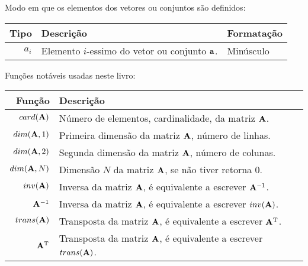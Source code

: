 \begin{notation}Modo em que os elementos dos vetores ou conjuntos são definidos:\\
\begin{tabular}{r | p{.6\linewidth} | l}
\hline	
Tipo & Descrição & Formatação \\ \hline
$a_{i}$ & Elemento $i$-essimo do vetor ou conjunto  $\VECTOR{a}$.& Minúsculo \\
\end{tabular}
\end{notation}


\begin{notation}Funções notáveis usadas neste livro:\\
\begin{tabular}{r | l }
\hline	
Função & Descrição \\ \hline
$card(\MATRIX{A})$ & Número de elementos, cardinalidade, da matriz $\MATRIX{A}$. \\
\hline
$dim(\MATRIX{A},1)$ & Primeira dimensão da matriz $\MATRIX{A}$, número de linhas. \\
$dim(\MATRIX{A},2)$ & Segunda dimensão da matriz $\MATRIX{A}$, número de colunas. \\
$dim(\MATRIX{A},N)$ & Dimensão $N$ da matriz $\MATRIX{A}$, se não tiver retorna $0$. \\
\hline
$\funcinv(\MATRIX{A})$ & Inversa da matriz $\MATRIX{A}$, é equivalente a escrever $\MATRIX{A}^{-1}$. \\
$\MATRIX{A}^{-1}$ & Inversa da matriz $\MATRIX{A}$, é equivalente a escrever $\funcinv(\MATRIX{A})$. \\
\hline
$\functrans(\MATRIX{A})$ & Transposta da matriz $\MATRIX{A}$, é equivalente a escrever $\MATRIX{A}^{\transpose}$. \\
$\MATRIX{A}^{\transpose}$ & Transposta da matriz $\MATRIX{A}$, é equivalente a escrever $trans(\MATRIX{A})$. \\
\end{tabular}
\end{notation}

